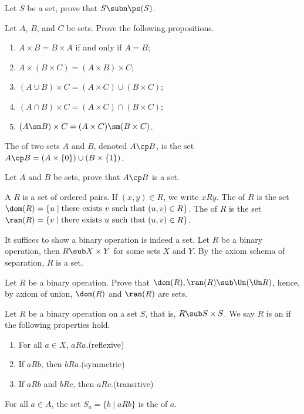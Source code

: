 \documentclass[10pt]{article}
\begin{document}
\begin{problem}
    Let $S$ be a set, prove that $S\subn\ps(S)$. 
\end{problem}
\begin{problem}
    Let $A$, $B$, and $C$ be sets. Prove the following propositions.
    \begin{enumerate}
        \item $A\times B=B\times A$ if and only if $A=B$;
        \item $A\times(B\times C)=(A\times B)\times C$;
        \item $(A\cup B)\times C=(A\times C)\cup(B\times C)$;
        \item $(A\cap B)\times C=(A\times C)\cap(B\times C)$;
        \item $(A\sm B)\times C=(A\times C)\sm(B\times C)$.
    \end{enumerate}
\end{problem}
\begin{definition}
    The  of two sets $A$ and $B$, denoted $A\cp B$, is the set $A\cp B=(A\times\{0\})\cup(B\times\{1\})$.
\end{definition}
\begin{problem}
    Let $A$ and $B$ be sets, prove that $A\cp B$ is a set.
\end{problem}
\begin{definition}
    A  $R$ is a set of ordered pairs. If $(x,y)\in R$, we write $xRy$. The  of $R$ is the set $\dom(R)=\{u\mid\text{there exists}\ v\ \text{such that}\ (u,v)\in R\}$. The  of $R$ is the set $\ran(R)=\{v\mid\text{there exists}\ u\ \text{such that}\ (u,v)\in R\}$. 
\end{definition}
\par
It suffices to show a binary operation is indeed a set. Let $R$ be a binary operation, then $R\sub X\times Y$ for some sets $X$ and $Y$. By the axiom schema of separation, $R$ is a set. 
\begin{problem}
    Let $R$ be a binary operation. Prove that $\dom(R),\ran(R)\sub\Un(\Un R)$, hence, by axiom of union, $\dom(R)$ and $\ran(R)$ are sets.
\end{problem}
\begin{definition}
    Let $R$ be a binary operation on a set $S$, that is, $R\sub S\times S$. We say $R$ is an  if the following properties hold.
    \begin{enumerate}
        \item For all $a\in X$, $aRa$.\hfill(reflexive)
        \item If $aRb$, then $bRa$.\hfill(symmetric)
        \item If $aRb$ and $bRc$, then $aRc$.\hfill(transitive)
    \end{enumerate}
    For all $a\in A$, the set ${S}_{a}=\{b\mid aRb\}$ is the  of $a$. 
\end{definition}
\end{document}
